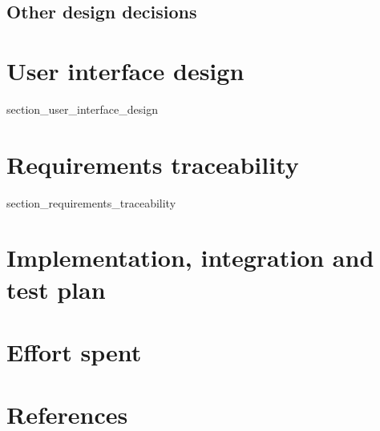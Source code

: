 \documentclass[a4paper]{article}
\begin{document}
\subsection{Other design decisions}

\newpage

\section{User interface design}\label{user_interface_design}
{section_user_interface_design}

\newpage

\section{Requirements traceability}\label{requirements_traceability}

{section_requirements_traceability}

\newpage

\section{Implementation, integration and test plan}\label{implementation_integration_test_plan}

\newpage

\section{Effort spent}\label{effort_spent}

\section{References}\label{references}
\end{document}
